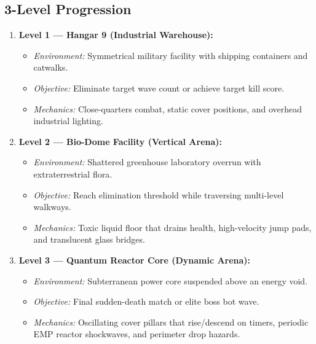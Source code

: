\documentclass[11pt,a4paper]{article}
\begin{document}
\subsection{3-Level Progression}
\begin{enumerate}
    \item \textbf{Level 1 --- Hangar 9 (Industrial Warehouse):}
    \begin{itemize}
        \item \textit{Environment:} Symmetrical military facility with shipping containers and catwalks.
        \item \textit{Objective:} Eliminate target wave count or achieve target kill score.
        \item \textit{Mechanics:} Close-quarters combat, static cover positions, and overhead industrial lighting.
    \end{itemize}
    \item \textbf{Level 2 --- Bio-Dome Facility (Vertical Arena):}
    \begin{itemize}
        \item \textit{Environment:} Shattered greenhouse laboratory overrun with extraterrestrial flora.
        \item \textit{Objective:} Reach elimination threshold while traversing multi-level walkways.
        \item \textit{Mechanics:} Toxic liquid floor that drains health, high-velocity jump pads, and translucent glass bridges.
    \end{itemize}
    \item \textbf{Level 3 --- Quantum Reactor Core (Dynamic Arena):}
    \begin{itemize}
        \item \textit{Environment:} Subterranean power core suspended above an energy void.
        \item \textit{Objective:} Final sudden-death match or elite boss bot wave.
        \item \textit{Mechanics:} Oscillating cover pillars that rise/descend on timers, periodic EMP reactor shockwaves, and perimeter drop hazards.
    \end{itemize}
\end{enumerate}
\end{document}
